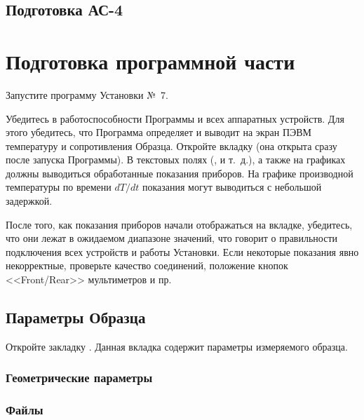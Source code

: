 \documentclass[12pt, a4paper, twocolumn]{report}
\begin{document}


\subsection{Подготовка АС-4}



\section{Подготовка программной части}

Запустите программу Установки №~7.

Убедитесь в работоспособности Программы и всех аппаратных устройств. Для этого убедитесь, что Программа определяет и выводит на экран ПЭВМ температуру и сопротивления Образца. Откройте вкладку  (она открыта сразу после запуска Программы). В текстовых полях (,  и т.~д.), а также на графиках должны выводиться обработанные показания приборов. На графике производной температуры по времени $dT/dt$ показания могут выводиться с небольшой задержкой.

После того, как показания приборов начали отображаться на вкладке, убедитесь, что они лежат в ожидаемом диапазоне значений, что говорит о правильности подключения всех устройств и работы Установки. Если некоторые показания явно некорректные, проверьте качество соединений, положение кнопок <<Front/Rear>> мультиметров и пр.

\subsection{Параметры Образца}

Откройте закладку . Данная вкладка содержит параметры измеряемого образца.

\subsubsection{Геометрические параметры}



\subsubsection{Файлы}


\end{document}
